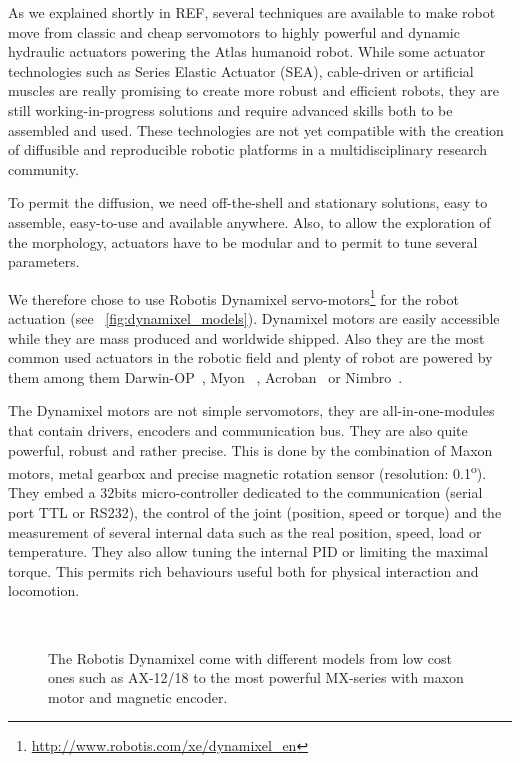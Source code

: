 As we explained shortly in REF, several techniques are available to make robot move from classic and cheap servomotors to highly powerful and dynamic hydraulic actuators powering the Atlas humanoid robot.
While some actuator technologies such as Series Elastic Actuator (SEA), cable-driven or artificial muscles are really promising to create more robust and efficient robots, they are still working-in-progress solutions and require advanced skills both to be assembled and used. These technologies are not yet compatible with the creation of diffusible and reproducible robotic platforms in a multidisciplinary research community.


To permit the diffusion, we need off-the-shell and stationary solutions, easy to assemble, easy-to-use and available anywhere. Also, to allow the exploration of the morphology, actuators have to be modular and to permit to tune several parameters.

We therefore chose to use Robotis Dynamixel servo-motors\footnote{\url{http://www.robotis.com/xe/dynamixel_en}} for the robot actuation (see \figurename~\ref{fig:dynamixel_models}). Dynamixel motors are easily accessible while they are mass produced and worldwide shipped. Also they are the most common used actuators in the robotic field and plenty of robot are powered by them among them Darwin-OP~\cite{REF}, Myon~\cite{REF} , Acroban~\cite{REF} or Nimbro~\cite{REF}.

The Dynamixel motors are not simple servomotors, they are all-in-one-modules that contain drivers, encoders and communication bus. They are also quite powerful, robust and rather precise. This is done by the combination of Maxon motors, metal gearbox and precise magnetic rotation sensor (resolution: 0.1\textsuperscript{o}). They embed a 32bits micro-controller dedicated to the communication (serial port TTL or RS232), the control of the joint (position, speed or torque) and the measurement of several internal data such as the real position, speed, load or temperature. They also allow tuning the internal PID or limiting the maximal torque. This permits rich behaviours useful both for physical interaction and locomotion.


\begin{figure}[tb]
\centering
    \hfil
    \\
    \caption{The Robotis Dynamixel come with different models from low cost ones such as AX-12/18 to the most powerful MX-series with maxon motor and magnetic encoder.}
    \label{fig:dynamixel_serie}
\end{figure}

